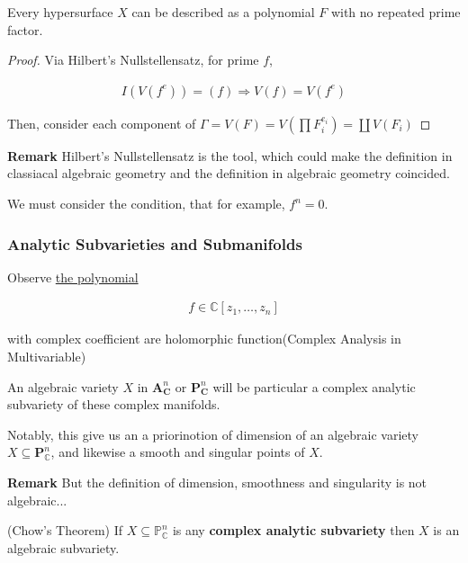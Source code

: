 \documentclass[Total.tex]{subfiles}
\begin{document}
			\begin{lemma}
				Every hypersurface $X$ can be described as a polynomial $F$ with no repeated prime factor.
			\end{lemma}
			
			\begin{proof}
				Via Hilbert's Nullstellensatz, for prime $f$,
				
				\begin{gather*}
					I(V(f^e))=(f)\Rightarrow V(f)=V(f^e)
				\end{gather*}
				
				Then, consider each component of $\Gamma=V(F)=V(\prod F_i^{e_i})=\coprod V(F_i)$
			\end{proof}
			
			\textbf{Remark} Hilbert's Nullstellensatz is the tool, which could make the definition in classiacal algebraic geometry and the definition in algebraic geometry coincided. 
			
			
			We must consider the condition, that for example, $f^n=0$.
			
			
			
			\subsubsection{Analytic Subvarieties and Submanifolds}
			
			\begin{example}
				Observe \underline{the polynomial}
				
				\begin{gather*}
					f\in \mathbb{C}[z_1,\dots,z_n]
				\end{gather*}
				
				with complex coefficient are holomorphic function(Complex Analysis in Multivariable)
				
				An algebraic variety $X$ in $\mathbf{A}^n_\mathbf{C}$ or $\mathbf{P}^n_\mathbf{C}$ will be particular a complex analytic subvariety of these complex manifolds. 
				
				Notably, this give us an a priorinotion of dimension of an algebraic variety $X\subseteq \mathbf{P}_\mathbb{C}^n$, and likewise a smooth and singular points of $X$.
			\end{example}
			
			\textbf{Remark} But the definition of dimension, smoothness and singularity is not algebraic...
			
			\begin{theorem}
				(Chow's Theorem) If $X\subseteq \mathbb{P}^n_\mathbb{C}$ is any \textbf{complex analytic subvariety} then $X$ is an algebraic subvariety.
			\end{theorem}
			
\end{document}
